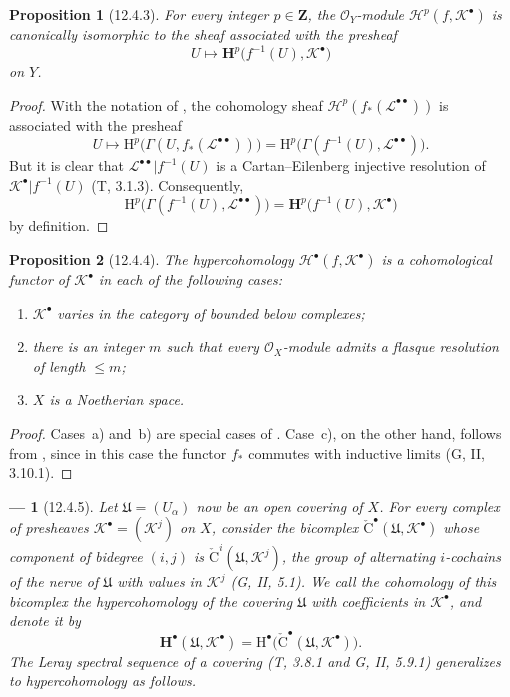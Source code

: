 \documentclass[oneside]{amsart}
\theoremstyle{ega-env-style}
\newtheorem*{env}{---}
\theoremstyle{ega-thm-env-style}
\newtheorem*{proposition}{Proposition}
\theoremstyle{ega-defn-env-style}
\def\mathcal{\mathscr}
\def\sh{\mathcal}                   %
\def\bb{\mathbf}                    %
\def\leq{\leqslant}                 %
\def\HH{\mathrm{H}}                 %
\let\EGAOriginalLabel\label
\renewcommand{\label}[1]{\phantomsection\EGAOriginalLabel{#1}}
\begin{document}
\begin{proposition}[12.4.3]
\label{0.12.4.3}
For every integer $p\in\bb{Z}$, the $\sh{O}_Y$-module
$\sh{H}^p(f,\sh{K}^\bullet)$ is canonically isomorphic to the sheaf
associated with the presheaf
\[
  U\longmapsto
  \bb{H}^p\bigl(f^{-1}(U),\sh{K}^\bullet\bigr)
\]
on $Y$.
\end{proposition}

\begin{proof}
With the notation of , the cohomology sheaf
$\sh{H}^p(f_*(\sh{L}^{\bullet\bullet}))$ is associated with the
presheaf
\[
  U\longmapsto
  \HH^p\bigl(\Gamma(U,f_*(\sh{L}^{\bullet\bullet}))\bigr)
  =
  \HH^p\bigl(\Gamma(f^{-1}(U),\sh{L}^{\bullet\bullet})\bigr).
\]
But it is clear that
$\sh{L}^{\bullet\bullet}|f^{-1}(U)$ is a Cartan--Eilenberg injective
resolution of $\sh{K}^\bullet|f^{-1}(U)$ (T, 3.1.3).
Consequently,
\[
  \HH^p\bigl(\Gamma(f^{-1}(U),\sh{L}^{\bullet\bullet})\bigr)
  =
  \bb{H}^p\bigl(f^{-1}(U),\sh{K}^\bullet\bigr)
\]
by definition.
\end{proof}

\begin{proposition}[12.4.4]
\label{0.12.4.4}
The hypercohomology $\sh{H}^\bullet(f,\sh{K}^\bullet)$ is a
cohomological functor of $\sh{K}^\bullet$ in each of the following
cases:
\begin{enumerate}
  \item[\rm{a)}] $\sh{K}^\bullet$ varies in the category of bounded
    below complexes;
  \item[\rm{b)}] there is an integer $m$ such that every
    $\sh{O}_X$-module admits a flasque resolution of length $\leq m$;
  \item[\rm{c)}] $X$ is a Noetherian space.
\end{enumerate}
\end{proposition}

\begin{proof}
Cases~a) and~b) are special cases of .
Case~c), on the other hand, follows from , since in
this case the functor $f_*$ commutes with inductive limits
(G, II, 3.10.1).
\end{proof}

\begin{env}[12.4.5]
\label{0.12.4.5}
Let $\mathfrak{U}=(U_\alpha)$ now be an open covering of $X$.
For every complex of \emph{presheaves}
$\sh{K}^\bullet=(\sh{K}^j)$ on $X$, consider the bicomplex
$\check{\mathrm{C}}^\bullet(\mathfrak{U},\sh{K}^\bullet)$ whose
component of bidegree $(i,j)$ is
$\check{\mathrm{C}}^i(\mathfrak{U},\sh{K}^j)$, the group of
alternating $i$-cochains of the nerve of $\mathfrak{U}$ with values
in $\sh{K}^j$ (G, II, 5.1).
We call the cohomology of this bicomplex the
\emph{hypercohomology of the covering $\mathfrak{U}$ with
coefficients in $\sh{K}^\bullet$}, and denote it by
\[
  \bb{H}^\bullet(\mathfrak{U},\sh{K}^\bullet)
  =
  \HH^\bullet
  \bigl(\check{\mathrm{C}}^\bullet
    (\mathfrak{U},\sh{K}^\bullet)\bigr).
\]
The Leray spectral sequence of a covering
(T, 3.8.1 and G, II, 5.9.1) generalizes to hypercohomology as follows.
\end{env}
\end{document}
